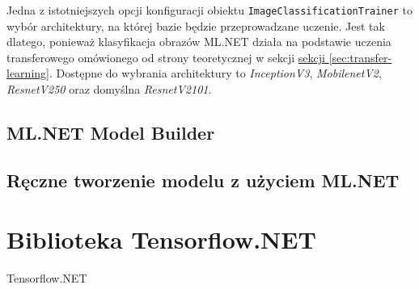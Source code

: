 Jedna z istotniejszych opcji konfiguracji obiektu \lstinline{ImageClassificationTrainer} to wybór architektury, na której bazie będzie przeprowadzane uczenie.
Jest tak dlatego, ponieważ klasyfikacja obrazów ML.NET działa na podstawie uczenia transferowego omówionego od strony teoretycznej w sekcji \hyperref[sec:transfer-learning]{sekcji \ref*{sec:transfer-learning}}.
Dostępne do wybrania architektury to \emph{InceptionV3}, \emph{MobilenetV2}, \emph{ResnetV250} oraz domyślna \emph{ResnetV2101}.

\subsection{ML.NET Model Builder}

\subsection{Ręczne tworzenie modelu z użyciem ML.NET}

\section{Biblioteka Tensorflow.NET}
\label{sec:tensorflownet}

Tensorflow.NET
